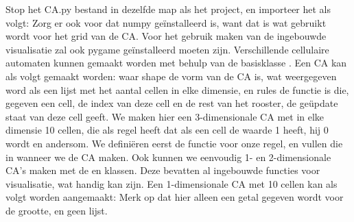 \markdownRendererDocumentBegin
{}\markdownRendererInterblockSeparator
{}\markdownRendererInterblockSeparator
{}Stop het CA.py bestand in dezelfde map als het project, en importeer het als volgt:\markdownRendererInterblockSeparator
{}\markdownRendererInterblockSeparator
{}Zorg er ook voor dat numpy geïnstalleerd is, want dat is wat gebruikt wordt voor het grid van de CA. Voor het gebruik maken van de ingebouwde visualisatie zal ook pygame geïnstalleerd moeten zijn.\markdownRendererInterblockSeparator
{}\markdownRendererInterblockSeparator
{}Verschillende cellulaire automaten kunnen gemaakt worden met behulp van de basisklasse . Een CA kan als volgt gemaakt worden:\markdownRendererInterblockSeparator
{}\markdownRendererInterblockSeparator
{}waar shape de vorm van de CA is, wat weergegeven word als een lijst met het aantal cellen in elke dimensie, en rules de functie is die, gegeven een cell, de index van deze cell en de rest van het rooster, de geüpdate staat van deze cell geeft.\markdownRendererInterblockSeparator
{}\markdownRendererInterblockSeparator
{}We maken hier een 3-dimensionale CA met in elke dimensie 10 cellen, die als regel heeft dat als een cell de waarde 1 heeft, hij 0 wordt en andersom.\markdownRendererInterblockSeparator
{}We definiëren eerst de functie voor onze regel, en vullen die in wanneer we de CA maken.\markdownRendererInterblockSeparator
{}\markdownRendererInterblockSeparator
{}\markdownRendererInterblockSeparator
{}Ook kunnen we eenvoudig 1- en 2-dimensionale CA's maken met de  en  klassen. Deze bevatten al ingebouwde functies voor visualisatie, wat handig kan zijn.\markdownRendererInterblockSeparator
{}Een 1-dimensionale CA met 10 cellen kan als volgt worden aangemaakt:\markdownRendererInterblockSeparator
{}\markdownRendererInterblockSeparator
{}Merk op dat hier alleen een getal gegeven wordt voor de grootte, en geen lijst.\markdownRendererInterblockSeparator
